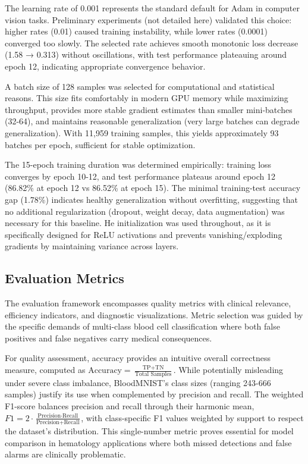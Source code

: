 \documentclass[runningheads]{llncs}
\begin{document}
The learning rate of 0.001 represents the standard default for Adam in computer vision tasks. Preliminary experiments
(not detailed here) validated this choice: higher rates (0.01) caused training instability, while lower rates (0.0001)
converged too slowly. The selected rate achieves smooth monotonic loss decrease (1.58 → 0.313) without oscillations,
with test performance plateauing around epoch 12, indicating appropriate convergence behavior.

A batch size of 128 samples was selected for computational and statistical reasons. This size fits comfortably in
modern GPU memory while maximizing throughput, provides more stable gradient estimates than smaller mini-batches (32-64),
and maintains reasonable generalization (very large batches can degrade generalization). With 11,959 training samples,
this yields approximately 93 batches per epoch, sufficient for stable optimization.

The 15-epoch training duration was determined empirically: training loss converges by epoch 10-12, and test performance
plateaus around epoch 12 (86.82\% at epoch 12 vs 86.52\% at epoch 15). The minimal training-test accuracy gap (1.78\%)
indicates healthy generalization without overfitting, suggesting that no additional regularization (dropout, weight decay,
data augmentation) was necessary for this baseline. He initialization was used throughout, as it is specifically designed
for ReLU activations and prevents vanishing/exploding gradients by maintaining variance across layers.

\subsection{Evaluation Metrics}

The evaluation framework encompasses quality metrics with clinical relevance, efficiency indicators, and diagnostic visualizations. Metric selection was guided by the specific demands of multi-class blood cell classification where both false positives and false negatives carry medical consequences.

For quality assessment, accuracy provides an intuitive overall correctness measure, computed as $\text{Accuracy} = \frac{\text{TP} + \text{TN}}{\text{Total Samples}}$. While potentially misleading under severe class imbalance, BloodMNIST's class sizes (ranging 243-666 samples) justify its use when complemented by precision and recall. The weighted F1-score balances precision and recall through their harmonic mean, $F1 = 2 \cdot \frac{\text{Precision} \cdot \text{Recall}}{\text{Precision} + \text{Recall}}$, with class-specific F1 values weighted by support to respect the dataset's distribution. This single-number metric proves essential for model comparison in hematology applications where both missed detections and false alarms are clinically problematic.
\end{document}
